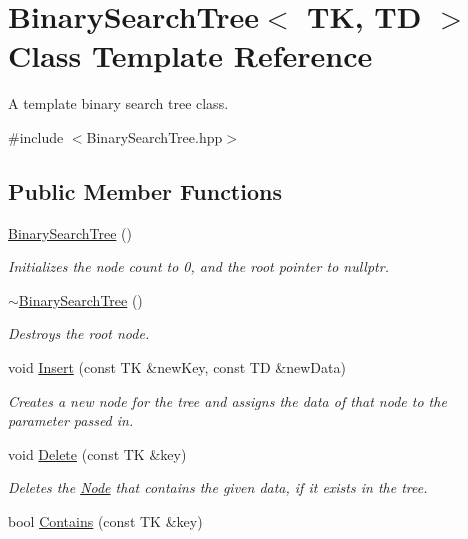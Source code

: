 \hypertarget{classBinarySearchTree}{}\section{Binary\+Search\+Tree$<$ TK, TD $>$ Class Template Reference}
\label{classBinarySearchTree}


A template binary search tree class.  




{\ttfamily \#include $<$Binary\+Search\+Tree.\+hpp$>$}

\subsection*{Public Member Functions}
\begin{DoxyCompactItemize}
\item 
\hyperlink{classBinarySearchTree_a3de2ca8efd1455d1ced09d49828cb75f}{Binary\+Search\+Tree} ()
\begin{DoxyCompactList}\small\item\em Initializes the node count to 0, and the root pointer to nullptr. \end{DoxyCompactList}\item 
\hyperlink{classBinarySearchTree_a32908378e03fb3dc0c515b65c81c17c6}{$\sim$\+Binary\+Search\+Tree} ()
\begin{DoxyCompactList}\small\item\em Destroys the root node. \end{DoxyCompactList}\item 
void \hyperlink{classBinarySearchTree_ab1214eb6e3d8cfb63f60c6345dc64b31}{Insert} (const TK \&new\+Key, const TD \&new\+Data)
\begin{DoxyCompactList}\small\item\em Creates a new node for the tree and assigns the data of that node to the parameter passed in. \end{DoxyCompactList}\item 
void \hyperlink{classBinarySearchTree_a1b7b6c893bd995f99522866a3cee1f04}{Delete} (const TK \&key)
\begin{DoxyCompactList}\small\item\em Deletes the \hyperlink{classNode}{Node} that contains the given data, if it exists in the tree. \end{DoxyCompactList}\item 
bool \hyperlink{classBinarySearchTree_a34d99fb23656d7c88ede34373991ce75}{Contains} (const TK \&key)

\end{DoxyCompactItemize}
